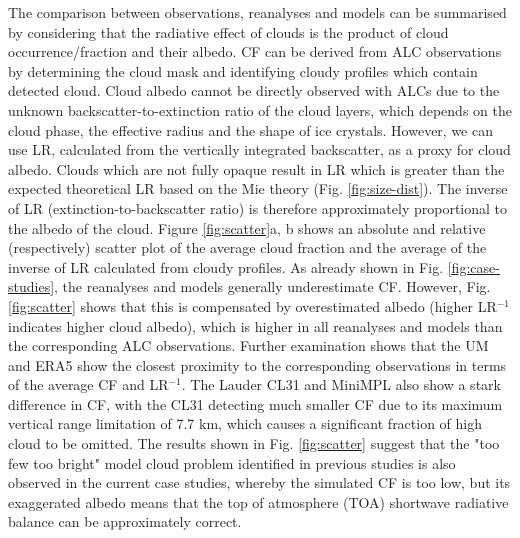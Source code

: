 The comparison between observations, reanalyses and models can be summarised
by considering that the radiative effect of clouds is the product of
cloud occurrence/fraction and their albedo. CF can be derived
from ALC observations by determining the cloud mask and identifying cloudy
profiles which contain detected cloud. Cloud albedo cannot be
directly observed with ALCs due to the unknown backscatter-to-extinction ratio of
the cloud layers, which depends on the cloud phase, the effective radius
and the shape of ice crystals. However, we can use LR, calculated from
the vertically integrated backscatter, as a proxy for cloud albedo. Clouds which
are not fully opaque result in LR which is greater than the expected theoretical
LR based on the Mie theory (Fig. \ref{fig:size-dist}). The inverse of LR (extinction-to-backscatter ratio)
is therefore approximately proportional to the albedo of the cloud.
Figure \ref{fig:scatter}a, b shows an absolute and relative (respectively) scatter plot of the average cloud fraction
and the average of the inverse of LR calculated from cloudy profiles.
As already shown in Fig. \ref{fig:case-studies}, the reanalyses and models generally underestimate
CF. However, Fig. \ref{fig:scatter} shows that this is compensated by overestimated albedo (higher LR$^{-1}$
indicates higher cloud albedo), which is higher in all reanalyses and models
than the corresponding ALC observations. Further examination shows that the UM and ERA5 show the closest
proximity to the corresponding observations in terms of the average CF and LR$^{-1}$. The Lauder CL31 and MiniMPL
also show a stark difference in CF, with the CL31 detecting much smaller CF due
to its maximum vertical range limitation of 7.7 km, which causes a significant
fraction of high cloud to be omitted. The results shown in Fig. \ref{fig:scatter}
suggest that the "too few too bright" model cloud problem identified in
previous studies \citep{nam2012,klein2013,wall2017,kuma2019} is also observed in the current case studies, whereby the
simulated CF is too low, but its exaggerated albedo means that
the top of atmosphere (TOA) shortwave radiative balance can be approximately
correct.

